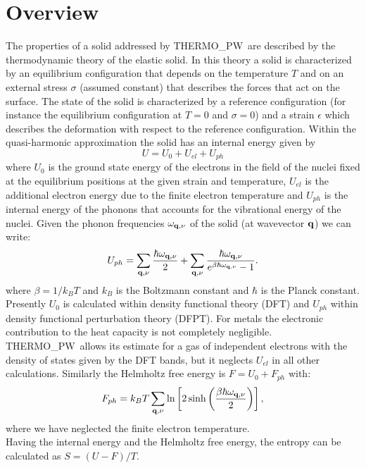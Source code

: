 \documentclass[12pt,a4paper]{article}
\def\tpw{{\sc THERMO\_PW}}
\begin{document}
\section{\color{coral}Overview}
The properties of a solid addressed by \tpw\ are described by the thermodynamic
theory of the elastic solid. In this theory a solid is characterized by an
equilibrium configuration that depends on the temperature $T$ and on an
external stress $\sigma$ (assumed constant) that describes the forces 
that act on the surface. The state
of the solid is characterized by a reference configuration 
(for instance the equilibrium configuration at $T=0$ and $\sigma=0$) and 
a strain $\epsilon$ which describes the deformation with respect to the 
reference configuration. 
Within the quasi-harmonic approximation the solid has an internal
energy given by  
\begin{equation}
U=U_0 + U_{el} + U_{ph}
\end{equation}
where $U_0$ is the ground state energy of the electrons in the field 
of the nuclei fixed at the equilibrium positions at the given strain and
temperature, $U_{el}$ is the additional electron energy due to the 
finite electron temperature and $U_{ph}$ is the internal energy of the 
phonons that accounts for the vibrational energy of the nuclei. 
Given the phonon frequencies $\omega_{{\bf q},\nu}$ of the solid 
(at wavevector ${\bf q}$) we can write:
\begin{equation}
U_{ph} = \sum_{{\bf q},\nu} {\hbar \omega_{{\bf q},\nu} \over 2}
+ \sum_{{\bf q},\nu} {\hbar \omega_{{\bf q},\nu} \over 
e^{\beta \hbar \omega_{{\bf q},\nu}}-1}.
\label{uvib}
\end{equation}
where $\beta=1/ k_B T$ and $k_B$ is the Boltzmann constant and $\hbar$ is the
Planck constant.
Presently $U_0$ is calculated within density functional theory (DFT) and
$U_{ph}$ within density functional perturbation theory (DFPT). 
For metals the electronic contribution to the heat capacity is not 
completely negligible. \tpw\ allows its estimate for a gas of 
independent electrons with the density of states given by the DFT bands,
but it neglects $U_{el}$ in all other calculations.
Similarly the Helmholtz free energy is $F=U_0+F_{ph}$ with:
\begin{equation}
F_{ph} = k_B T \sum_{{\bf q},\nu} \ln \left[ 2 \sinh \left({\beta \hbar 
\omega_{{\bf q},\nu} \over 2}\right) \right],
\nonumber
\end{equation}
where we have neglected the finite electron temperature. \\
Having the internal energy and the Helmholtz free energy, the entropy can 
be calculated as $S=(U-F)/T$.
\end{document}
